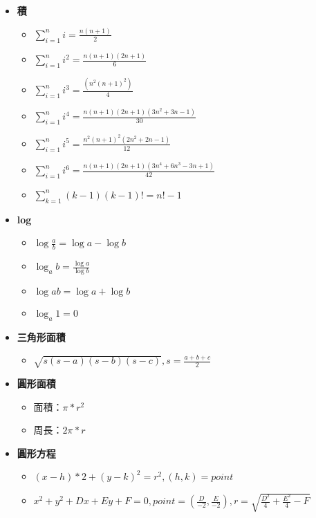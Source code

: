 \usepackage{amsmath}

\begin{itemize}
  \item \textbf{積}
  \begin{itemize}
    \item $\sum \limits_{i=1}^n i = \frac{n(n+1)}{2}$
    \item $\sum \limits_{i=1}^n i^2 = \frac{n(n+1)(2n+1)}{6}$
    \item $\sum \limits_{i=1}^n i^3 = \frac{(n^2(n+1)^2)}{4}$
    \item $\sum \limits_{i=1}^n i^4 = \frac{n(n+1)(2n+1)(3n^2+3n-1)}{30}$
    \item $\sum \limits_{i=1}^n i^5 = \frac{n^2(n+1)^2(2n^2+2n-1)}{12}$
    \item $\sum \limits_{i=1}^n i^6 = \frac{n(n+1)(2n+1)(3n^4+6n^3-3n+1)}{42}$
    \item $\sum \limits_{k=1}^n (k-1)(k-1)! = n!-1$
  \end{itemize}
  
  \item \textbf{log}
  \begin{itemize}
    \item $\log\frac{a}{b} = \log a - \log b$
    \item $\log_a b = \frac{\log a}{\log b}$
    \item $\log ab = \log a + \log b$
    \item $\log_a 1 = 0$
  \end{itemize}
  
  \item \textbf{三角形面積}
  \begin{itemize}
    \item $\sqrt{s(s-a)(s-b)(s-c)}, s = \frac{a+b+c}{2}$
  \end{itemize}

  \item \textbf{圓形面積}
  \begin{itemize}
    \item 面積：$\pi *r^2$
    \item 周長：$2\pi *r$
  \end{itemize}

  \item \textbf{圓形方程}
  \begin{itemize}
    \item $(x-h)*2+(y-k)^2 = r^2, (h, k) = point$
    \item $x^2 + y^2 + Dx + Ey + F = 0, point=(\frac{D}{-2}, \frac{E}{-2}), r = \sqrt{\frac{D^2}{4}+\frac{E^2}{4}-F}$
    

\end{itemize}
\end{itemize}
